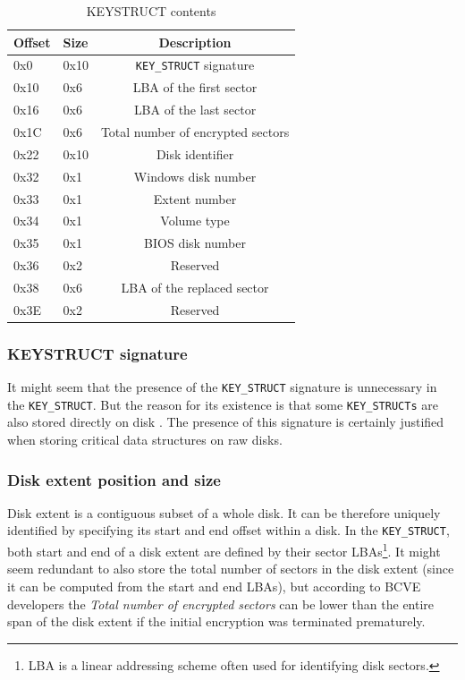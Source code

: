 \documentclass[thesis=B,english]{FITthesis}[2012/10/20]
\begin{document}
	\begin{table}
		\centering
		\begin{tabular}{|l | l | c |} 
			\hline
			Offset & Size & Description \\
			\hline \hline
			0x0  & 0x10  & \verb|KEY_STRUCT| signature	\\
			\hline
			0x10 & 0x6 & LBA of the first sector \\ 
			\hline
			0x16 & 0x6 & LBA of the last sector \\ 
			\hline
			0x1C & 0x6 & Total number of encrypted sectors \\ 
			\hline
			0x22 & 0x10 & Disk identifier \\ 
			\hline
			0x32 & 0x1 & Windows disk number \\ 
			\hline
			0x33 & 0x1 & Extent number \\ 
			\hline
			0x34 & 0x1 & Volume type \\ 
			\hline
			0x35 & 0x1 & BIOS disk number \\ 
			\hline
			0x36 & 0x2 & Reserved \\ 
			\hline
			0x38 & 0x6 & LBA of the replaced sector \\ 
			\hline
			0x3E & 0x2 & Reserved \\ 
			\hline
		\end{tabular}
		\caption{KEY\TextUnderscore{}STRUCT contents}
		\label{tab:keystruct}
	\end{table}
	
	\subsubsection{KEY\textunderscore{}STRUCT signature}
	
	It might seem that the presence of the \verb|KEY_STRUCT| signature is unnecessary in
	the \verb|KEY_STRUCT|. But the reason for its existence is that some \verb|KEY_STRUCTs| are also stored directly on disk \cite{hornak}. The presence of this signature is certainly justified when storing critical data structures on raw disks.
	
	\subsubsection{Disk extent position and size}
	
	Disk extent is a contiguous subset of a whole disk. It can be therefore uniquely identified by specifying its start and end offset within a disk. In the \verb|KEY_STRUCT|, both start and end of a disk extent are defined by their sector LBAs\footnote{LBA is a linear addressing scheme often used for identifying disk sectors.}. It might seem redundant to also store the total number of sectors in the disk extent (since it can be computed from the start and end LBAs), but according to BCVE developers the \textit{Total number of encrypted sectors} can be lower than the entire span of the disk extent if the initial encryption was terminated prematurely. 
	
\end{document}
